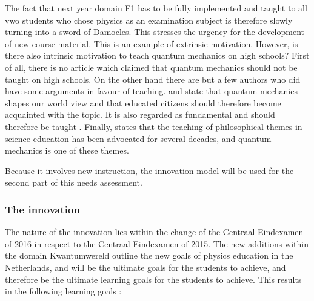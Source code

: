 \documentclass[11pt,twoside]{report} %
\begin{document}
The fact that next year domain F1 has to be fully implemented and taught to all vwo students who chose physics as an examination subject is therefore slowly turning into a sword of Damocles. This stresses the urgency for the development of new course material. This is an example of extrinsic motivation. However, is there also intrinsic motivation to teach quantum mechanics on high schools? First of all, there is no article which claimed that quantum mechanics should not be taught on high schools. On the other hand there are but a few authors who did have some arguments in favour of teaching.  and  state that quantum mechanics shapes our world view and that educated citizens should therefore become acquainted with the topic. It is also regarded as fundamental and should therefore be taught \cite{henriksen,hobson}. Finally,  states that the teaching of philosophical themes in science education has been advocated for several decades, and quantum mechanics is one of these themes.

Because it involves new instruction, the innovation model will be used for the second part of this needs assessment.

\subsubsection{The innovation}
\label{sssec:needsassessmentinnovation}

The nature of the innovation lies within the change of the Centraal Eindexamen of 2016 in respect to the Centraal Eindexamen of 2015. The new additions within the domain Kwantumwereld outline the new goals of physics education in the Netherlands, and will be the ultimate goals for the students to achieve, and therefore be the ultimate learning goals for the students to achieve. This results in the following learning goals \cite{eindexamen2016}:
\end{document}

